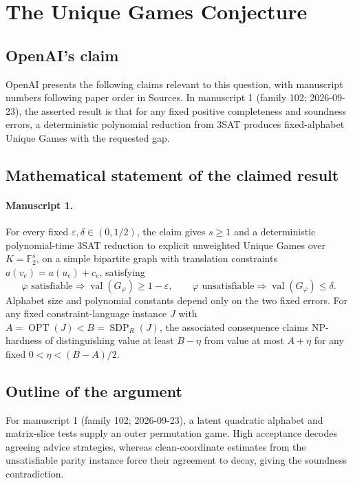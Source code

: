 \documentclass[11pt]{article}
\begin{document}
\section*{The Unique Games Conjecture}

\subsection{OpenAI's claim}
OpenAI presents the following claims relevant to this question, with manuscript numbers following paper order in Sources. In manuscript 1 (family 102; 2026-09-23), the asserted result is that for any fixed positive completeness and soundness errors, a deterministic polynomial reduction from 3SAT produces fixed-alphabet Unique Games with the requested gap.

\subsection{Mathematical statement of the claimed result}
\paragraph{Manuscript 1.}
For every fixed $\varepsilon,\delta\in(0,1/2)$, the claim gives $s\ge1$ and a deterministic polynomial-time $3$SAT reduction to explicit unweighted Unique Games over $K=\mathbb F_2^s$, on a simple bipartite graph with translation constraints $a(v_e)=a(u_e)+c_e$, satisfying
\[
 \varphi\text{ satisfiable}\Rightarrow\operatorname{val}(G_{\varphi})\ge1-\varepsilon,
 \qquad\varphi\text{ unsatisfiable}\Rightarrow\operatorname{val}(G_{\varphi})\le\delta.
\]
Alphabet size and polynomial constants depend only on the two fixed errors. For any fixed constraint-language instance $J$ with $A=\operatorname{OPT}(J)<B=\operatorname{SDP}_{R}(J)$, the associated consequence claims NP-hardness of distinguishing value at least $B-\eta$ from value at most $A+\eta$ for any fixed $0<\eta<(B-A)/2$.

\subsection{Outline of the argument}
For manuscript 1 (family 102; 2026-09-23), a latent quadratic alphabet and matrix-slice tests supply an outer permutation game. High acceptance decodes agreeing advice strategies, whereas clean-coordinate estimates from the unsatisfiable parity instance force their agreement to decay, giving the soundness contradiction.
\end{document}
